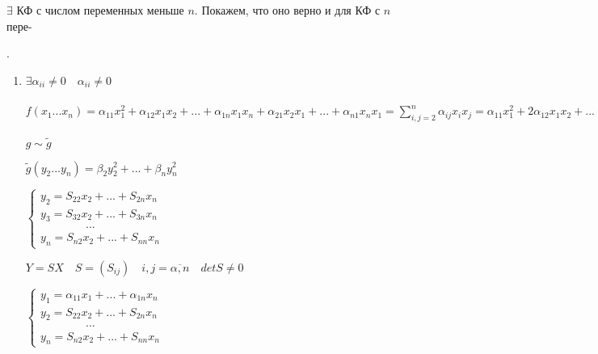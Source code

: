 \documentclass[a4paper, 12pt]{report}
\begin{document}
	\quad$\exists$ КФ с числом переменных меньше $n$.
	Покажем, что оно верно и для КФ с $n$ пере-
	
	.
	\begin{enumerate}
		\item $\exists \alpha_{ii} \ne 0 \quad \alpha_{ii} \ne 0$
		
		$f(x_1...x_n) = \alpha_{11}x_1^2 + \alpha_{12}x_1 x_2 + ... + \alpha_{1n}x_1 x_n + \alpha_{21}x_2x_1 + ... + \alpha_{n1}x_nx_1 = \sum\limits_{i,j=2}^n \alpha_{ij} x_i x_j = \alpha_{11}x_1^2 + 2 \alpha_{12}x_1 x_2 + ... + 2 \alpha_{1n}x_1 x_n + \sum\limits_{i,j=2}^n \alpha_{ij} x_i x_j = \dfrac{1}{\alpha_{11}}(\alpha_{11}x_1^2 + 2 \alpha_{11}\alpha_{12}x_1 x_2 + ... + 2 \alpha_{11}\alpha_{1n}x_1 x_n) + \sum\limits_{i,j=2}^n \alpha_{ij} x_i x_j = \dfrac{1}{\alpha_{11}}(\alpha_{11}x_1 + \alpha_{12}x_2 + ... + \alpha_{1n}x_n)^1 - \dfrac{1}{\alpha_{11}}(\alpha_{12}x_2 + ... + \alpha_{1n}x_n)^2 + \sum\limits_{i,j=2}^n \alpha_{ij} x_i x_j = \dfrac{1}{\alpha_{11}}(\alpha_{11}x_1 + \alpha_{12}x_2 + ... + \alpha_{1n}x_n)^2 + g(x_2...x_n)$
		\par\bigskip
		$g \sim \tilde{g}$
		
		$\tilde{g}(y_2...y_n) = \beta_2 y_2^2 + ... + \beta_n y_n^2$
		\par\bigskip
		$\begin{cases} y_2 = S_{22}x_2 + ... + S_{2n} x_n \\ y_3 = S_{32}x_2 + ... + S_{3n} x_n \\ \qquad\qquad... \\ y_n = S_{n2}x_2 + ... + S_{nn} x_n \end{cases}$
		
		$Y = SX \quad S = (S_{ij}) \quad i,j = \overline{\alpha, n} \quad detS \ne 0$
		\par\bigskip
		$\begin{cases} y_1 = \alpha_{11}x_1 + ... + \alpha_{1n} x_n \\ y_2 = S_{22}x_2 + ... + S_{2n} x_n \\ \qquad\qquad... \\ y_n = S_{n2}x_2 + ... + S_{nn} x_n \end{cases}$
		

\end{enumerate}
\end{document}
